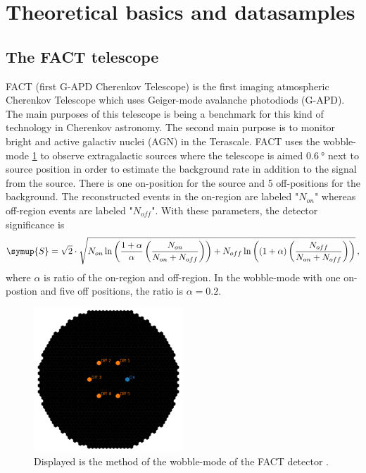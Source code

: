 \section{Theoretical basics and datasamples}
\label{sec:theorie}

\subsection{The FACT telescope}
FACT (first G-APD Cherenkov Telescope) is the first imaging atmospheric Cherenkov Telescope which uses Geiger-mode avalanche photodiods (G-APD). 
The main purposes of this telescope is being a benchmark for this kind of technology in Cherenkov astronomy.
The second main purpose is to monitor bright and active galactiv nuclei (AGN) in the Terascale.
FACT uses the wobble-mode \ref{fig:wobble} to observe extragalactic sources where the telescope is aimed $\SI{0.6}{\degree}$ next to 
source position in order to estimate the background rate 
in addition to the signal from the source. There is one on-position for the source and 5 off-positions for the background.
The reconstructed events in the on-region are labeled "$N_{on}$" whereas off-region events are labeled "$N_{off}$".
With these parameters, the detector significance is
\begin{equation*}
  \symup{S} = \sqrt{2}\cdot \sqrt{N_{on} \ln\left( \frac{1 + \alpha}{\alpha} \left(  \frac{N_{on}}{N_{on} + N_{off}}\right)\right) +
  N_{off} \ln\left( (1 + \alpha) \left(\frac{N_{off}}{N_{on} + N_{off}}\right)\right)} \, ,
\end{equation*}
where $\alpha$ is ratio of the on-region and off-region. In the wobble-mode with one on-postion and five off positions, the ratio is $\alpha = 0.2$.

\begin{figure}[H]
  \centering
  \includegraphics[width=0.5\textwidth]{fact_pics/wobblemode.png}
  \caption{Displayed is the method of the wobble-mode of the FACT detector \cite{ANLEITUNG}.}
  \label{fig:wobble}
\end{figure}

